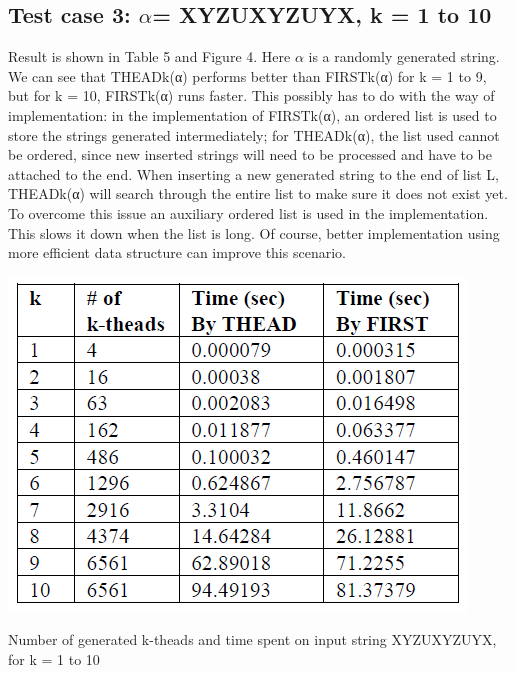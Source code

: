 \documentclass{sig-alternate-05-2015}
\begin{document}
\subsection{Test case 3: $\alpha$= XYZUXYZUYX, k = 1 to 10}
Result is shown in Table 5 and Figure 4. Here $\alpha$ is a randomly
generated string. We can see that THEADk(α) performs
better than FIRSTk(α) for k = 1 to 9, but for k = 10,
FIRSTk(α) runs faster. This possibly has to do with the way
of implementation: in the implementation of FIRSTk(α), an
ordered list is used to store the strings generated intermediately;
for THEADk(α), the list used cannot be ordered,
since new inserted strings will need to be processed and
have to be attached to the end. When inserting a new generated
string to the end of list L, THEADk(α) will search
through the entire list to make sure it does not exist yet. To
overcome this issue an auxiliary ordered list is used in the
implementation. This slows it down when the list is long.
Of course, better implementation using more efficient data
structure can improve this scenario.

\begin{table}
\centering
\includegraphics[scale=0.5]{table5.PNG}
\caption{Number of generated k-theads and time spent on
input string XYZUXYZUYX, for k = 1 to 10}
\label{table:5}
\end{table}
\end{document}
